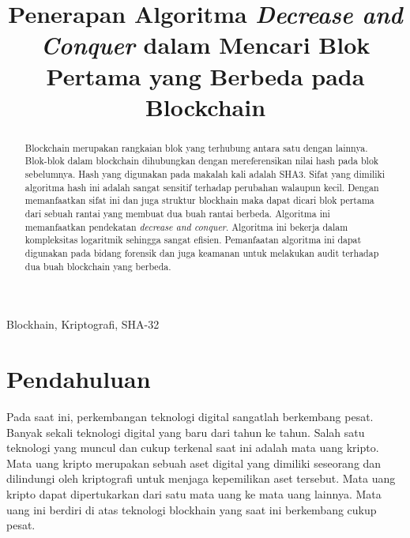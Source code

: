 \documentclass[10pt,conference]{IEEEtran}
\theoremstyle{definition}
\begin{document}
\title{Penerapan Algoritma  \emph{Decrease and Conquer} dalam Mencari Blok Pertama yang Berbeda pada Blockchain}

\author{
}

\maketitle

\begin{abstract}
Blockchain merupakan rangkaian blok yang terhubung antara satu dengan lainnya. Blok-blok dalam blockchain dihubungkan dengan mereferensikan nilai hash pada blok sebelumnya. Hash yang digunakan pada makalah kali adalah SHA3. Sifat yang dimiliki algoritma hash ini adalah sangat sensitif terhadap perubahan walaupun kecil. Dengan memanfaatkan sifat ini dan juga struktur blockhain maka dapat dicari blok pertama dari sebuah rantai yang membuat dua buah rantai berbeda. Algoritma ini memanfaatkan pendekatan \emph{decrease and conquer}. Algoritma ini bekerja dalam kompleksitas logaritmik sehingga sangat efisien. Pemanfaatan algoritma ini dapat digunakan pada bidang forensik dan juga keamanan untuk melakukan audit terhadap dua buah blockchain yang berbeda.
\end{abstract}

\begin{IEEEkeywords}
Blockhain, Kriptografi, SHA-32
\end{IEEEkeywords}

\section{Pendahuluan}
Pada saat ini, perkembangan teknologi digital sangatlah berkembang pesat. Banyak sekali teknologi digital yang baru dari tahun ke tahun. Salah satu teknologi yang muncul dan cukup terkenal saat ini adalah mata uang kripto. Mata uang kripto merupakan sebuah aset digital yang dimiliki seseorang dan dilindungi oleh kriptografi untuk menjaga kepemilikan aset tersebut. Mata uang kripto dapat dipertukarkan dari satu mata uang ke mata uang lainnya. Mata uang ini berdiri di atas teknologi blockhain yang saat ini berkembang cukup pesat.
\end{document}
